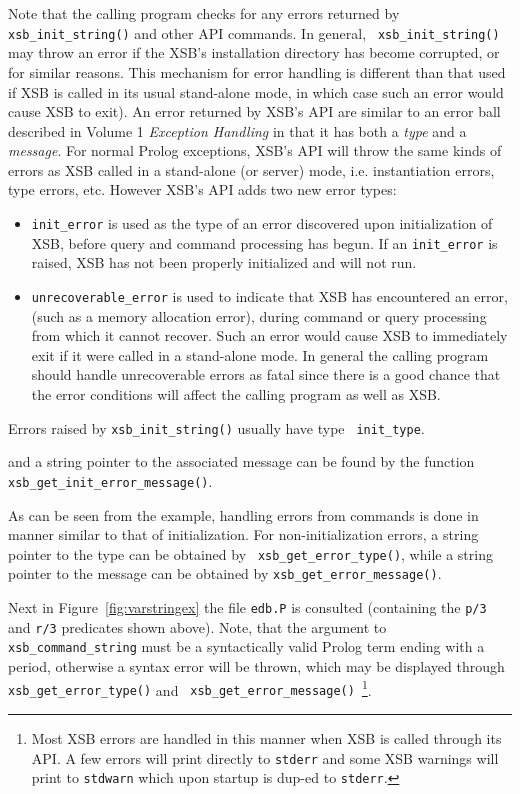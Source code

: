Note that the calling program checks for any errors returned by {\tt
  xsb\_init\_string()} and other API commands.  In general, {\tt
  xsb\_init\_string()} may throw an error if the XSB's installation
directory has become corrupted, or for similar reasons.  This
mechanism for error handling is different than that used if XSB is
called in its usual stand-alone mode, in which case such an error
would cause XSB to exit).  An error returned by XSB's API are similar
to an error ball described in Volume 1 {\em Exception Handling} in
that it has both a {\em type} and a {\em message}.  For normal Prolog
exceptions, XSB's API will throw the same kinds of errors as XSB
called in a stand-alone (or server) mode, i.e. instantiation errors,
type errors, etc.  However XSB's API adds two new error types:
%
\begin{itemize}
\item {\tt init\_error} is used as the type of an error discovered
  upon initialization of XSB, before query and command processing has
  begun.  If an {\tt init\_error} is raised, XSB has not been properly
  initialized and will not run.
%
\item {\tt unrecoverable\_error} is used to indicate that XSB has
  encountered an error, (such as a memory allocation error), during
  command or query processing from which it cannot recover.  Such an
  error would cause XSB to immediately exit if it were called in a
  stand-alone mode.  In general the calling program should handle
  unrecoverable errors as fatal since there is a good chance that the
  error conditions will affect the calling program as well as XSB.
\end{itemize}
%
Errors raised by {\tt xsb\_init\_string()} usually have type {\tt
  init\_type}.  

 and a string pointer to the associated message can be
found by the function {\tt xsb\_get\_init\_error\_message()}.  

As can be seen from the example, handling errors from commands is done
in manner similar to that of initialization.  For non-initialization
errors, a string pointer to the type can be obtained by {\tt
  xsb\_get\_error\_type()}, while a string pointer to the message can
be obtained by {\tt xsb\_get\_error\_message()}.  

Next in Figure~\ref{fig:varstringex} the file {\tt edb.P} is consulted
(containing the {\tt p/3} and {\tt r/3} predicates shown above).
Note, that the argument to {\tt xsb\_command\_string} must be a
syntactically valid Prolog term ending with a period, otherwise a
syntax error will be thrown, which may be displayed through {\tt
  xsb\_get\_error\_type()} and {\tt
  xsb\_get\_error\_message()}~\footnote{Most XSB errors are handled in
  this manner when XSB is called through its API.  A few errors will
  print directly to {\tt stderr} and some XSB warnings will print to
  {\tt stdwarn} which upon startup is dup-ed to {\tt stderr}.}.

